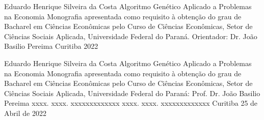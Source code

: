 \folharosto
	{Eduardo Henrique Silveira da Costa}
	{Algoritmo Genético Aplicado a Problemas na Economia}
	{Monografia apresentada como requisito à obtenção do grau de Bacharel em Ciências Econômicas pelo Curso de Ciências Econômicas, Setor de Ciências Sociais Aplicada, Universidade Federal do Paraná.}
	{Orientador: Dr. João Basilio Pereima}
	{Curitiba}
	{2022}


\folhatermoaprovacao
	{Eduardo Henrique Silveira da Costa}
	{Algoritmo Genético Aplicado a Problemas na Economia}
	{Monografia apresentada como requisito à obtenção do grau de Bacharel em Ciências Econômicas pelo Curso de Ciências Econômicas, Setor de Ciências Sociais Aplicada, Universidade Federal do Paraná:}
	{Prof. Dr. João Basilio Pereima}
	{xxxx. xxxx. xxxxxxxxxxxxx}
	{xxxx. xxxx. xxxxxxxxxxxxx}
	{Curitiba}
	{25 de Abril de 2022}


